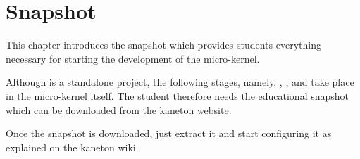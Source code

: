 %
%
%
%
%
%

%
%

\chapter{Snapshot}
\label{chapter:snapshot}

This chapter introduces the snapshot which provides students everything
necessary for starting the development of the  micro-kernel.

\newpage

%
%

Although  is a standalone project, the following stages, namely,
, ,  and  take place in the micro-kernel
itself. The student therefore needs the educational snapshot which can be
downloaded from the kaneton website.

Once the snapshot is downloaded, just extract it and start configuring it
as explained on the kaneton wiki.
